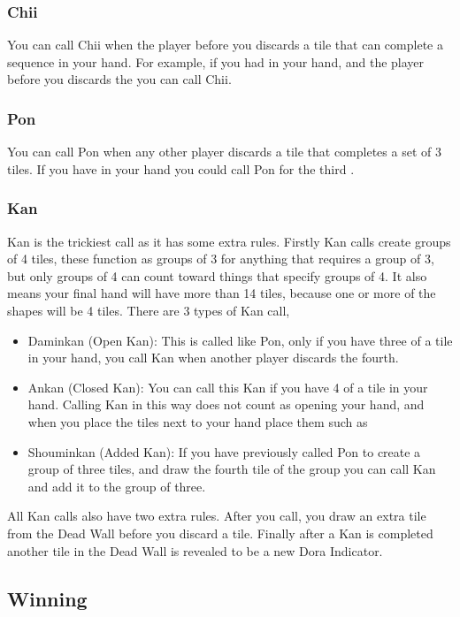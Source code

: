 \documentclass[a4paper,12pt]{article}
\newcommand{\mj}[1]{\mahjong{#1}}
\newcommand{\mmj}[1]{\begin{displayquote}\mahjong{#1}\end{displayquote}}
\begin{document}
\subsubsection{Chii}

You can call Chii when the player before you 
discards a tile that can complete a sequence in your hand. 
For example, if you had \mj{57p} in your hand, 
and the player before you discards the \mj{6p} you can 
call Chii.

\subsubsection{Pon}

You can call Pon when any other player discards a 
tile that completes a set of 3 tiles. If you have \mj{77m} in 
your hand you could call Pon for the third \mj{7m}.

\subsubsection{Kan}

Kan is the trickiest call as it has some extra rules. Firstly 
Kan calls create groups of 4 tiles, these function as groups of 
3 for anything that requires a group of 3, but only groups of 4 
can count toward things that specify groups of 4. It also means 
your final hand will have more than 14 tiles, because one or more 
of the shapes will be 4 tiles. There are 3 types of Kan call,
\begin{itemize}
\item Daminkan (Open Kan): This is called like Pon, only if 
you have three of a tile in your hand, you call Kan when 
another player discards the fourth.
\item Ankan (Closed Kan): You can call this Kan if you have 
4 of a tile in your hand. Calling Kan in this way does not 
count as opening your hand, and when you place the tiles 
next to your hand place them such as
\mmj{X55Xs}
\item Shouminkan (Added Kan): If you have previously called 
Pon to create a group of three tiles, and draw the fourth 
tile of the group you can call Kan and add it to the group 
of three.
\end{itemize}
All Kan calls also have two extra rules. After you call, 
you draw an extra tile from the Dead Wall before you discard 
a tile. Finally after a Kan is completed another tile 
in the Dead Wall is revealed to be a new Dora Indicator.

\subsection{Winning}
\end{document}
